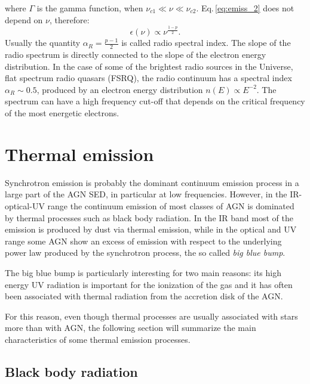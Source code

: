 \documentclass[../main.tex]{subfiles}
\begin{document}
where $\Gamma$ is the gamma function, when $\nu_{c1}\ll\nu\ll\nu_{c2}$.
Eq.\,\ref{eq:emiss_2} does not depend on $\nu$, therefore:
\begin{equation}
    \label{eq:emiss_3}
    \epsilon(\nu) \propto \nu^{\frac{1-p}{2}}.
\end{equation}
Usually the quantity $\alpha_R = \frac{p-1}{2}$ is called radio spectral index.
The slope of the radio spectrum is directly connected to the slope of the electron energy distribution.
In the case of some of the brightest radio sources in the Universe, flat spectrum radio quasars (FSRQ), the radio continuum has a spectral index $\alpha_R \sim 0.5$, produced by an electron energy distribution $n(E)\propto E^{-2}$.
The spectrum can have a high frequency cut-off that depends on the critical frequency of the most energetic electrons.

\section{Thermal emission}
\label{sec:thermal_emission}

Synchrotron emission is probably the dominant continuum emission process in a large part of the AGN SED, in particular at low frequencies.
However, in the IR-optical-UV range the continuum emission of most classes of AGN is dominated by thermal processes such as black body radiation.
In the IR band most of the emission is produced by dust via thermal emission, while in the optical and UV range some AGN show an excess of emission with respect to the underlying power law produced by the synchrotron process, the so called \emph{big blue bump}.

The big blue bump is particularly interesting for two main reasons: its high energy UV radiation is important for the ionization of the gas and it has often been associated with thermal radiation from the accretion disk of the AGN.

For this reason, even though thermal processes are usually associated with stars more than with AGN, the following section will summarize the main characteristics of some thermal emission processes.

\subsection{Black body radiation}
\end{document}

